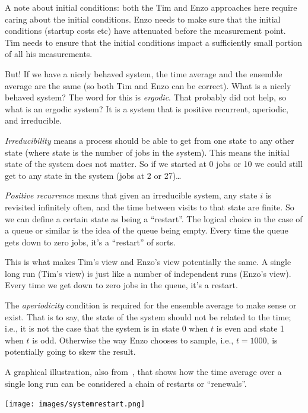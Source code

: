 \documentclass[a4paper]{report}
\begin{document}
A note about initial conditions: both the Tim and Enzo approaches here require caring about the initial conditions. Enzo needs to make sure that the initial conditions (startup costs etc) have attenuated before the measurement point. Tim needs to ensure that the initial conditions impact a sufficiently small portion of all his measurements.

But! If we have a nicely behaved system, the time average and the ensemble average are the same (so both Tim and Enzo can be correct). What is a nicely behaved system? The word for this is \textit{ergodic}. That probably did not help, so what is an ergodic system? It is a system that is positive recurrent, aperiodic, and irreducible.

\textit{Irreducibility} means a process should be able to get from one state to any other state (where state is the number of jobs in the system). This means the initial state of the system does not matter. So if we started at 0 jobs or 10 we could still get to any state in the system (jobs at 2 or 27)\ldots

\textit{Positive recurrence} means that given an irreducible system, any state $i$ is revisited infinitely often, and the time between visits to that state are finite. So we can define a certain state as being a ``restart''. The logical choice in the case of a queue or similar is the idea of the queue being empty. Every time the queue gets down to zero jobs, it's a ``restart'' of sorts. 

This is what makes Tim's view and Enzo's view potentially the same. A single long run (Tim's view) is just like a number of independent runs (Enzo's view). Every time we get down to zero jobs in the queue, it's a restart. 

The \textit{aperiodicity} condition is required for the ensemble average to make sense or exist. That is to say, the state of the system should not be related to the time; i.e., it is not the case that the system is in state 0 when $t$ is even and state 1 when $t$ is odd. Otherwise the way Enzo chooses to sample, i.e., $t = 1000$, is potentially going to skew the result.

A graphical illustration, also from~\cite{pmd}, that shows how the time average over a single long run can be considered a chain of restarts or ``renewals''.

\begin{center}
	\texttt{[image: images/systemrestart.png]}
\end{center}
\end{document}
